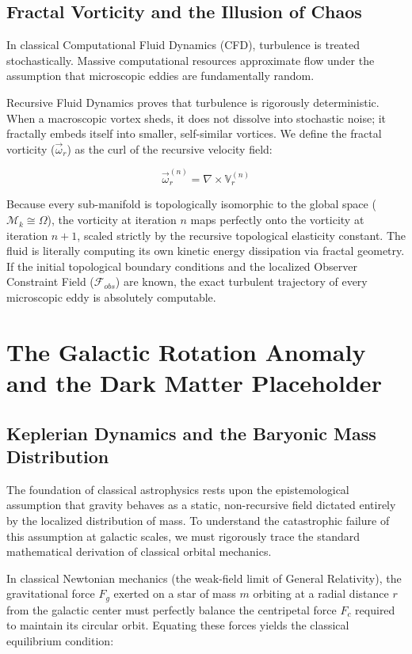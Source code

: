 \documentclass[12pt,openany]{book}
\begin{document}
\section{Fractal Vorticity and the Illusion of Chaos}
In classical Computational Fluid Dynamics (CFD), turbulence is treated stochastically. Massive computational resources approximate flow under the assumption that microscopic eddies are fundamentally random. 

Recursive Fluid Dynamics proves that turbulence is rigorously deterministic. When a macroscopic vortex sheds, it does not dissolve into stochastic noise; it fractally embeds itself into smaller, self-similar vortices. We define the fractal vorticity ($\vec{\omega}_r$) as the curl of the recursive velocity field:

\begin{equation}
\vec{\omega}_r^{(n)} = \nabla \times \mathbb{V}_r^{(n)}
\end{equation}

Because every sub-manifold is topologically isomorphic to the global space ($\mathcal{M}_k \cong \Omega$), the vorticity at iteration $n$ maps perfectly onto the vorticity at iteration $n+1$, scaled strictly by the recursive topological elasticity constant. The fluid is literally computing its own kinetic energy dissipation via fractal geometry. If the initial topological boundary conditions and the localized Observer Constraint Field ($\mathcal{F}_{obs}$) are known, the exact turbulent trajectory of every microscopic eddy is absolutely computable.

\chapter[The Galactic Rotation Anomaly]{The Galactic Rotation Anomaly and the Dark Matter Placeholder}

\section{Keplerian Dynamics and the Baryonic Mass Distribution}
The foundation of classical astrophysics rests upon the epistemological assumption that gravity behaves as a static, non-recursive field dictated entirely by the localized distribution of mass. To understand the catastrophic failure of this assumption at galactic scales, we must rigorously trace the standard mathematical derivation of classical orbital mechanics.

In classical Newtonian mechanics (the weak-field limit of General Relativity), the gravitational force $F_g$ exerted on a star of mass $m$ orbiting at a radial distance $r$ from the galactic center must perfectly balance the centripetal force $F_c$ required to maintain its circular orbit. Equating these forces yields the classical equilibrium condition:
\end{document}
